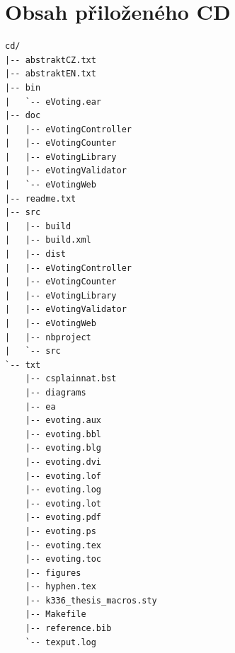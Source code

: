 \documentclass[11pt,twoside,a4paper]{book}
\begin{document}
\chapter{Obsah přiloženého CD}

\begin{verbatim}
cd/
|-- abstraktCZ.txt
|-- abstraktEN.txt
|-- bin
|   `-- eVoting.ear
|-- doc
|   |-- eVotingController
|   |-- eVotingCounter
|   |-- eVotingLibrary
|   |-- eVotingValidator
|   `-- eVotingWeb
|-- readme.txt
|-- src
|   |-- build
|   |-- build.xml
|   |-- dist
|   |-- eVotingController
|   |-- eVotingCounter
|   |-- eVotingLibrary
|   |-- eVotingValidator
|   |-- eVotingWeb
|   |-- nbproject
|   `-- src
`-- txt
    |-- csplainnat.bst
    |-- diagrams
    |-- ea
    |-- evoting.aux
    |-- evoting.bbl
    |-- evoting.blg
    |-- evoting.dvi
    |-- evoting.lof
    |-- evoting.log
    |-- evoting.lot
    |-- evoting.pdf
    |-- evoting.ps
    |-- evoting.tex
    |-- evoting.toc
    |-- figures
    |-- hyphen.tex
    |-- k336_thesis_macros.sty
    |-- Makefile
    |-- reference.bib
    `-- texput.log
\end{verbatim}
\end{document}
